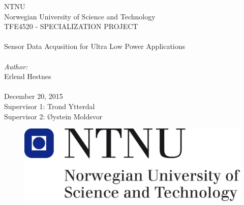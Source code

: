 \thispagestyle{empty}

\begin{center}

\Large{NTNU}\\
\normalsize{Norwegian University of Science and Technology}\\
[3pc]
\Large{TFE4520 - SPECIALIZATION PROJECT}\\

\Huge{\hrulefill\\Sensor Data Acqusition for Ultra Low Power Applications\\\hrulefill}\\[2pc]

\small{\textit{Author:}}\\\Large{Erlend Hestnes}\\
\mbox{}\\[3pc]
\large{December 20, 2015}\\[2pc]

\small{Supervisor 1: Trond Ytterdal} \\
\small{Supervisor 2: Øystein Moldsvor}

\end{center}
\vfill

\begin{figure}[h]
\centering
\includegraphics[scale=0.5]{fig/NTNU.png}
\label{fig:frontpage_logo}
\end{figure}
